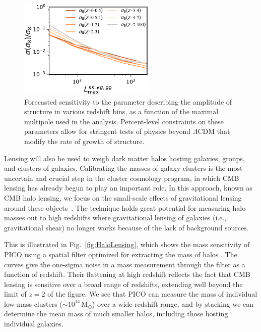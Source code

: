 \documentclass[PICOReport.tex]{subfiles}
\begin{document}
\begin{figure}
\hspace{0.1in}
\parbox{3.3in}{
\caption{\label{fig:sigma8constraint} Forecasted sensitivity to  the parameter describing the amplitude of structure in various redshift bins, as a function of the maximal multipole used in the analysis.  Percent-level constraints on these parameters allow for stringent tests of physics beyond $\Lambda$CDM that modify the rate of growth of structure. } }
\hspace{0.1in}
\parbox{2.9in}{\centerline {
\includegraphics[width=2.6in]{images/PICO_s8_lmax_PICOv4.1b_deproj0_SENS0.pdf} } }
\vspace{-0.1in}
\end{figure}


Lensing will also be used to weigh dark matter halos hosting galaxies, groups, and clusters of galaxies.  Calibrating the masses of galaxy clusters is the most uncertain and crucial step in the cluster cosmology program, in which CMB lensing has already begun to play an important role.  In this approach, known as CMB halo lensing, we focus on the small-scale effects of gravitational lensing around these objects~\citep{2015ApJ...806..247B, 2015PhRvL.114o1302M, 2016A&A...594A..24P}. The technique holds great potential for measuring halo masses out to high redshifts where gravitational lensing of galaxies (i.e., gravitational shear) no longer works because of the lack of background sources.

This is illustrated in Fig.~\ref{fig:HaloLensing}, which shows the mass sensitivity of PICO using a spatial filter optimized for extracting the mass of halos \citep{2015A&A...578A..21M}.  The curves give the one-sigma noise in a mass measurement through the filter as a function of redshift.  Their flattening at high redshift reflects the fact that CMB lensing is sensitive over a broad range of redshifts, extending well beyond the limit of $z=2$ of the figure.  We see that PICO can measure the mass of individual low-mass clusters ($\sim 10^{14}$\,M$_\odot$) over a wide redshift range, and by stacking we can determine the mean mass of much smaller halos, including those hosting individual galaxies.  
\end{document}

